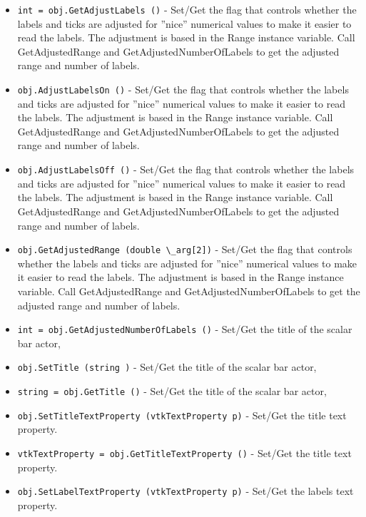 \begin{itemize}
\item  \verb|int = obj.GetAdjustLabels ()| -  Set/Get the flag that controls whether the labels and ticks are
 adjusted for ''nice'' numerical values to make it easier to read 
 the labels. The adjustment is based in the Range instance variable.
 Call GetAdjustedRange and GetAdjustedNumberOfLabels to get the adjusted
 range and number of labels.

\item  \verb|obj.AdjustLabelsOn ()| -  Set/Get the flag that controls whether the labels and ticks are
 adjusted for ''nice'' numerical values to make it easier to read 
 the labels. The adjustment is based in the Range instance variable.
 Call GetAdjustedRange and GetAdjustedNumberOfLabels to get the adjusted
 range and number of labels.

\item  \verb|obj.AdjustLabelsOff ()| -  Set/Get the flag that controls whether the labels and ticks are
 adjusted for ''nice'' numerical values to make it easier to read 
 the labels. The adjustment is based in the Range instance variable.
 Call GetAdjustedRange and GetAdjustedNumberOfLabels to get the adjusted
 range and number of labels.

\item  \verb|obj.GetAdjustedRange (double \_arg[2])| -  Set/Get the flag that controls whether the labels and ticks are
 adjusted for ''nice'' numerical values to make it easier to read 
 the labels. The adjustment is based in the Range instance variable.
 Call GetAdjustedRange and GetAdjustedNumberOfLabels to get the adjusted
 range and number of labels.

\item  \verb|int = obj.GetAdjustedNumberOfLabels ()| -  Set/Get the title of the scalar bar actor,

\item  \verb|obj.SetTitle (string )| -  Set/Get the title of the scalar bar actor,

\item  \verb|string = obj.GetTitle ()| -  Set/Get the title of the scalar bar actor,

\item  \verb|obj.SetTitleTextProperty (vtkTextProperty p)| -  Set/Get the title text property.

\item  \verb|vtkTextProperty = obj.GetTitleTextProperty ()| -  Set/Get the title text property.

\item  \verb|obj.SetLabelTextProperty (vtkTextProperty p)| -  Set/Get the labels text property.


\end{itemize}
